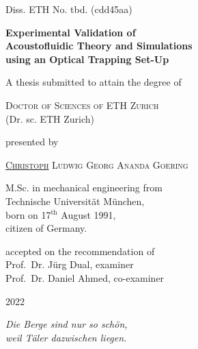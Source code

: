 \begin{titlepage}
  {Diss. ETH No. tbd. (cdd45aa) \vspace{2.5cm}}
\begin{center}
\Large{\textbf{Experimental Validation of\\ Acoustofluidic Theory and 
Simulations\\ using an Optical Trapping Set-Up}}
\end{center}
\vspace{2.0cm}
\begin{center}
{A thesis submitted to attain the degree of}
\end{center}
\begin{center}
{\textsc{Doctor of Sciences of ETH Zurich}}\\
{(Dr. sc. ETH Zurich)}
\end{center}
\vspace{10mm}
\begin{center}
{presented by}
\end{center}
\begin{center}
  {\textsc{\underline{Christoph} Ludwig Georg Ananda Goering}}
\end{center}
\begin{center}
{M.Sc. in mechanical engineering from\\
Technische Universit\"at M\"unchen,\\
born on 17$^{\text{th}}$ August 1991,\\
citizen of Germany.}
\end{center}
\vspace{10mm}
\begin{center}
{accepted on the recommendation of \\ \vspace{0.3cm}
Prof.\ Dr. J\"urg Dual, examiner \\
Prof.\ Dr. Daniel Ahmed, co-examiner}
\end{center}
\vspace{5mm}
\begin{center}
2022
\end{center}

\cleardoublepage
\thispagestyle{empty}
\vspace*{5.0cm}

\begin{flushright}
\vspace*{0.5cm}
\large
\textit{Die Berge sind nur so schön,\\ weil Täler dazwischen liegen.}

\end{flushright}

\clearpage
\cleardoublepage
\end{titlepage}
